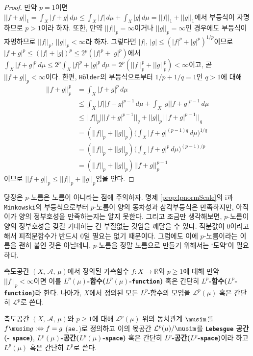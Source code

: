 \begin{proof}
    만약 $p=1$이면 $||f+g||_1=\int_X|f+g|\,d\mu\leq\int_X|f|\,d\mu+\int_X|g|\,d\mu=||f||_1+||g||_1$에서 부등식이 자명하므로 $p>1$이라 하자. 또한, 만약 $||f||_p=\infty$이거나 $||g||_p=\infty$인 경우에도 부등식이 자명하므로 $||f||_p,\,||g||_p<\infty$라 하자. 그렇다면 $|f|,\,|g|\leq(|f|^p+|g|^p)^{1/p}$이므로 $|f+g|^p\leq(|f|+|g|)^p\leq2^p(|f|^p+|g|^p)$에서 $\int_X|f+g|^p\,d\mu\leq2^p\int_X|f|^p+|g|^p\,d\mu=2^p(||f||_p^p+||g||_p^p)<\infty$이고, 곧 $||f+g||_p<\infty$이다. 한편, \texttt{H\"older}의 부등식으로부터 $1/p+1/q=1$인 $q>1$에 대해
    \begin{align*}
        ||f+g||_p^p&=\int_X|f+g|^p\,d\mu\\
        &\leq\int_X|f||f+g|^{p-1}\,d\mu+\int_X|g||f+g|^{p-1}\,d\mu\\
        &\leq||f||_p|||f+g|^{p-1}||_q+||g||_p|||f+g|^{p-1}||_q\\
        &=(||f||_p+||g||_p)\bigg(\int_X|f+g|^{(p-1)q}\,d\mu\bigg)^{1/q}\\
        &=(||f||_p+||g||_p)\bigg(\int_X|f+g|^p\,d\mu\bigg)^{(p-1)/p}\\
        &=(||f||_p+||g||_p)||f+g||_p^{p-1}
    \end{align*}
    이므로 $||f+g||_p\leq||f||_p+||g||_p$임을 안다.
\end{proof}

당장은 $p$-노름은 노름이 아니라는 점에 주의하자. 명제 \ref{prop:lpnormScale}의 i과 \texttt{Minkowski}의 부등식으로부터 $p$-노름이 양의 동차성과 삼각부등식은 만족하지만, 아직 이가 양의 정부호성을 만족하는지는 알지 못한다. 그리고 조금만 생각해보면, $p$-노름이 양의 정부호성을 갖길 기대하는 건 부질없는 것임을 깨달을 수 있다. 적분값이 0이라고 해서 피적분함수가 반드시 0일 필요는 없기 때문이다. 그럼에도 이에 $p$-노름이라는 이름을 괜히 붙인 것은 아닐테니, $p$-노름을 정말 노름으로 만들기 위해서는 `도약'이 필요하다.

\begin{definition}
    측도공간 $(X,\,\mathcal{A},\,\mu)$에서 정의된 가측함수 $f:X\to\overline{\mathbb{R}}$와 $p\geq1$에 대해 만약 $||f||_p<\infty$이면 이를 \textbf{$L^p(\mu)$-함수($L^p(\mu)$-\texttt{function})} 혹은 간단히 \textbf{$L^p$-함수($L^p$-\texttt{function})}라 한다. 나아가, $X$에서 정의된 모든 $L^p$-함수의 모임을 $\mathcal{L}^p(\mu)$ 혹은 간단히 $\mathcal{L}^p$로 쓴다.
\end{definition}

\begin{definition}
    측도공간 $(X,\,\mathcal{A},\,\mu)$와 $p\geq1$에 대해 $\mathcal{L}^p(\mu)$ 위의 동치관계 $\musim$를 $f\musim g:\Leftrightarrow f=g$ (\texttt{ae.})로 정의하고 이의 몫공간 $\mathcal{L}^p(\mu)/\musim$를 \textbf{\texttt{Lebesgue} 공간(- \texttt{space})}, \textbf{$L^p(\mu)$-공간($L^p(\mu)$-\texttt{space})} 혹은 간단히 \textbf{$L^p$-공간($L^p$-\texttt{space})}이라 하고 $L^p(\mu)$ 혹은 간단히 $L^p$로 쓴다.
\end{definition}

